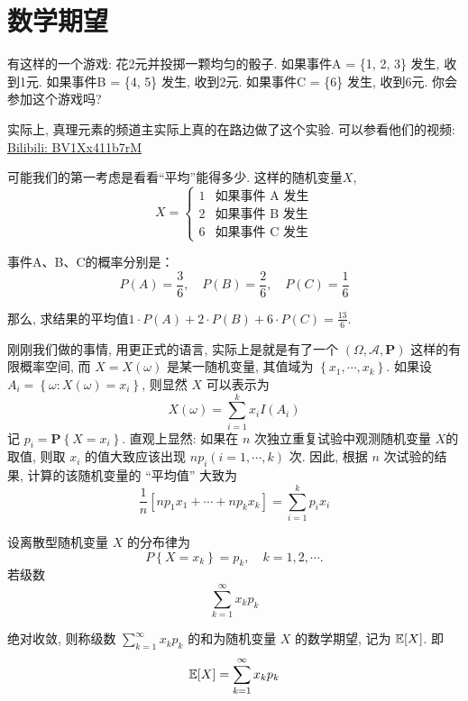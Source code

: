 \section{数学期望}

有这样的一个游戏: 花2元并投掷一颗均匀的骰子. 如果事件A = \{1, 2, 3\} 发生, 收到1元. 如果事件B = \{4, 5\} 发生, 收到2元. 如果事件C = \{6\} 发生, 收到6元. 你会参加这个游戏吗?

\begin{webaside}
    实际上, 真理元素的频道主实际上真的在路边做了这个实验. 可以参看他们的视频: \href{https://www.bilibili.com/video/BV1Xx411b7rM}{Bilibili: BV1Xx411b7rM}
\end{webaside}

可能我们的第一考虑是看看``平均''能得多少. 这样的随机变量$X$, \[
    X =
    \begin{cases}
    1 & \text{如果事件 A 发生} \\
    2 & \text{如果事件 B 发生} \\
    6 & \text{如果事件 C 发生}
    \end{cases}
    \]
    
    事件A、B、C的概率分别是：
    \[P(A) = \frac{3}{6}, \quad P(B) = \frac{2}{6}, \quad P(C) = \frac{1}{6}\]
    
    那么, 求结果的平均值$1 \cdot P(A) + 2 \cdot P(B) + 6 \cdot P(C)= \frac{13}{6}$.

    刚刚我们做的事情, 用更正式的语言, 实际上是就是有了一个 $(\Omega, \mathscr{A}, \mathbf{P})$ 这样的有限概率空间, 而 $X=X(\omega)$ 是某一随机变量, 其值域为 $\left\{x_1, \cdots, x_k\right\}$. 如果设 $A_i=\left\{\omega: X(\omega)=x_i\right\}$, 则显然 $X$ 可以表示为
    $$
    X(\omega)=\sum_{i=1}^k x_i I\left(A_i\right)
    $$记 $p_i=\mathbf{P}\left\{X=x_i\right\}$. 直观上显然: 如果在 $n$ 次独立重复试验中观测随机变量 $X$的取值, 则取 $x_i$ 的值大致应该出现 $n p_i(i=1, \cdots, k)$ 次. 
    因此, 根据 $n$ 次试验的结果, 计算的该随机变量的 “平均值” 大致为
    $$
    \frac{1}{n}\left[n p_1 x_1+\cdots+n p_k x_k\right]=\sum_{i=1}^k p_i x_i
    $$

    \begin{definition}[离散型随机变量的期望]
        设离散型随机变量 $X$ 的分布律为
        $$
        P\left\{X=x_k\right\}=p_k, \quad k=1,2, \cdots .
        $$
        若级数
    $$
    \sum_{k=1}^{\infty} x_k p_k
    $$
    
    绝对收敛, 则称级数 $\sum_{k=1}^{\infty} x_k p_k$ 的和为随机变量 $X$ 的数学期望, 记为 $\mathbb E[X]$. 即
    $$
    \mathbb E[X]=\sum_{k=1}^{\infty} x_k p_k
    $$
    \end{definition}


